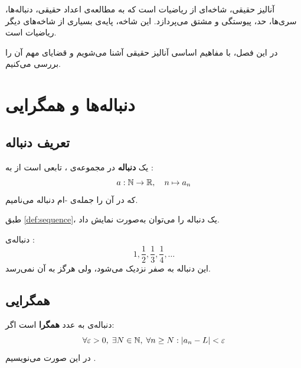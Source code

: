آنالیز حقیقی، شاخه‌ای از
ریاضیات است که به مطالعه‌ی اعداد حقیقی،
دنباله‌ها، سری‌ها، حد، پیوستگی و مشتق
می‌پردازد. این شاخه، پایه‌ی بسیاری از
شاخه‌های دیگر ریاضیات است.

در این فصل، با مفاهیم اساسی آنالیز حقیقی
آشنا می‌شویم و قضایای مهم آن را بررسی
می‌کنیم.


\section{دنباله‌ها و همگرایی}
\label{sec:math-book-sequences}

\subsection{تعریف دنباله}
\label{sec:math-book-sequence-def}

\begin{definition}[دنباله]
    یک \textbf{دنباله} در
    مجموعه‌ی \lr{$\R$}، تابعی است از
    \lr{$\N$} به \lr{$\R$}:
    \[
        a: \mathbb{N} \to \mathbb{R}, \quad n \mapsto a_n
    \]
    که در آن  را جمله‌ی -ام
    دنباله می‌نامیم.
    \label{def:sequence}
\end{definition}

طبق \cref{def:sequence}، یک دنباله را
می‌توان به‌صورت 
نمایش داد.

\begin{example}
    دنباله‌ی :
    \[
        1, \frac{1}{2}, \frac{1}{3}, \frac{1}{4}, \ldots
    \]
    این دنباله به صفر نزدیک می‌شود، ولی
    هرگز به آن نمی‌رسد.
    \label{ex:harmonic}
\end{example}

\subsection{همگرایی}
\label{sec:math-book-convergence}

\begin{definition}
    دنباله‌ی  به عدد 
    \textbf{همگرا} است اگر:
    \[
        \forall \varepsilon > 0, \;
        \exists N \in \mathbb{N}, \;
        \forall n \geq N: \lvert a_n - L\rvert < \varepsilon
    \]
    در این صورت می‌نویسیم
    .
    \label{def:convergence}
\end{definition}

